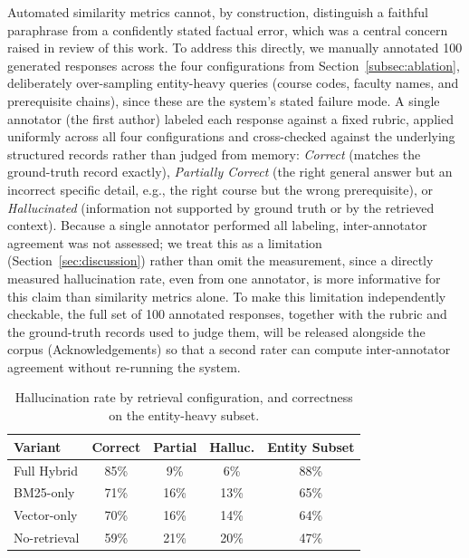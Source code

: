 \documentclass[a4paper,twoside]{article}
\begin{document}
Automated similarity metrics cannot, by construction, distinguish a faithful paraphrase from a confidently stated factual error, which was a central concern raised in review of this work. To address this directly, we manually annotated 100 generated responses across the four configurations from Section~\ref{subsec:ablation}, deliberately over-sampling entity-heavy queries (course codes, faculty names, and prerequisite chains), since these are the system's stated failure mode. A single annotator (the first author) labeled each response against a fixed rubric, applied uniformly across all four configurations and cross-checked against the underlying structured records rather than judged from memory: \emph{Correct} (matches the ground-truth record exactly), \emph{Partially Correct} (the right general answer but an incorrect specific detail, e.g., the right course but the wrong prerequisite), or \emph{Hallucinated} (information not supported by ground truth or by the retrieved context). Because a single annotator performed all labeling, inter-annotator agreement was not assessed; we treat this as a limitation (Section~\ref{sec:discussion}) rather than omit the measurement, since a directly measured hallucination rate, even from one annotator, is more informative for this claim than similarity metrics alone. To make this limitation independently checkable, the full set of 100 annotated responses, together with the rubric and the ground-truth records used to judge them, will be released alongside the corpus (Acknowledgements) so that a second rater can compute inter-annotator agreement without re-running the system.

\begin{table}[t]
\caption{Hallucination rate by retrieval configuration, and correctness on the entity-heavy subset.}\label{tab:hallucination} \centering
\begin{tabular}{|l|c|c|c|c|}
\hline
Variant & Correct & Partial & Halluc. & Entity Subset \\
\hline
Full Hybrid & 85\% & 9\% & 6\% & 88\% \\
BM25-only & 71\% & 16\% & 13\% & 65\% \\
Vector-only & 70\% & 16\% & 14\% & 64\% \\
No-retrieval & 59\% & 21\% & 20\% & 47\% \\
\hline
\end{tabular}
\end{table}
\end{document}
